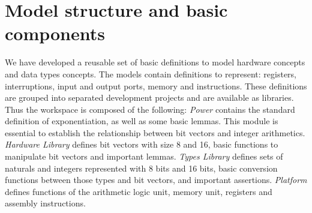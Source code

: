 \documentclass[a4paper]{llncs}
\begin{document}



\section{Model structure and basic components}
\label{sec:models}

We have developed a reusable set of basic definitions to model
hardware concepts and data types concepts. The models contain
definitions to represent: registers, interruptions, input and
output ports, memory and instructions. These definitions are grouped
into separated development projects and are available as libraries.
Thus the workspace is composed of the following: \textit{Power} contains the standard definition of exponentiation, as
  well as some basic lemmas. This module is essential to establish the relationship between
  bit vectors and integer arithmetics. \textit{Hardware Library} defines bit vectors with size 8 and 16, basic
  functions to manipulate bit vectors and important lemmas. \textit{Types Library} defines sets of naturals and integers represented
  with 8 bits and 16 bits, basic conversion functions between those
  types and bit vectors, and important assertions. \textit{Platform} defines functions of the arithmetic logic unit, memory
  unit, registers and assembly instructions.
  
\end{document}
